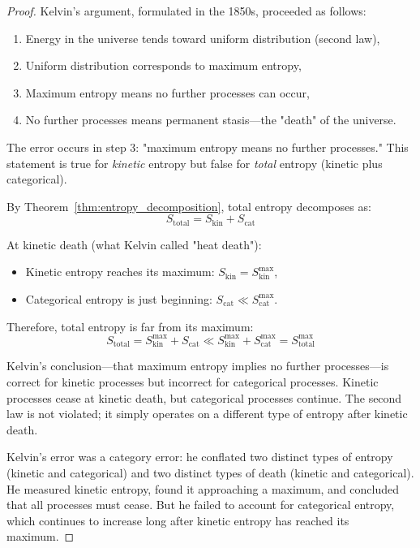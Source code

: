 \documentclass[12pt,a4paper]{article}
\theoremstyle{definition}
\theoremstyle{remark}
\begin{document}
\begin{proof}
Kelvin's argument, formulated in the 1850s, proceeded as follows:
\begin{enumerate}
    \item Energy in the universe tends toward uniform distribution (second law),
    \item Uniform distribution corresponds to maximum entropy,
    \item Maximum entropy means no further processes can occur,
    \item No further processes means permanent stasis—the "death" of the universe.
\end{enumerate}

The error occurs in step 3: "maximum entropy means no further processes." This statement is true for \emph{kinetic} entropy but false for \emph{total} entropy (kinetic plus categorical).

By Theorem~\ref{thm:entropy_decomposition}, total entropy decomposes as:
\begin{equation}
S_{\text{total}} = S_{\text{kin}} + S_{\text{cat}}
\end{equation}

At kinetic death (what Kelvin called "heat death"):
\begin{itemize}
    \item Kinetic entropy reaches its maximum: $S_{\text{kin}} = S_{\text{kin}}^{\max}$,
    \item Categorical entropy is just beginning: $S_{\text{cat}} \ll S_{\text{cat}}^{\max}$.
\end{itemize}

Therefore, total entropy is far from its maximum:
\begin{equation}
S_{\text{total}} = S_{\text{kin}}^{\max} + S_{\text{cat}} \ll S_{\text{kin}}^{\max} + S_{\text{cat}}^{\max} = S_{\text{total}}^{\max}
\end{equation}

Kelvin's conclusion—that maximum entropy implies no further processes—is correct for kinetic processes but incorrect for categorical processes. Kinetic processes cease at kinetic death, but categorical processes continue. The second law is not violated; it simply operates on a different type of entropy after kinetic death.

Kelvin's error was a category error: he conflated two distinct types of entropy (kinetic and categorical) and two distinct types of death (kinetic and categorical). He measured kinetic entropy, found it approaching a maximum, and concluded that all processes must cease. But he failed to account for categorical entropy, which continues to increase long after kinetic entropy has reached its maximum.
\end{proof}
\end{document}
